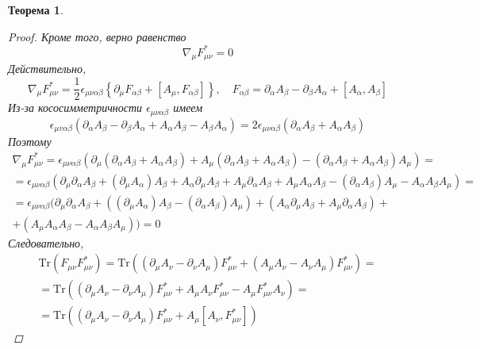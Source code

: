 \documentclass[12pt]{article}
\newtheorem{theorem}{Теорема}[section]
\theoremstyle{definition}
\begin{document}
\begin{theorem}
\begin{proof}
        Кроме того, верно равенство
        \begin{equation}
            \nabla_\mu F_{\mu \nu}^*=0
        \end{equation}
        Действительно,
        \begin{equation}
            \nabla_\mu F_{\mu \nu}^*=\frac{1}{2} \epsilon_{\mu \nu \alpha \beta}\left\{\partial_\mu F_{\alpha \beta}+\left[A_\mu, F_{\alpha \beta}\right]\right\},\quad F_{\alpha \beta}=\partial_\alpha A_\beta-\partial_\beta A_\alpha+[A_\alpha,A_\beta]
        \end{equation}
        Из-за кососимметричности $\epsilon_{\mu\nu\alpha\beta}$ имеем
        \begin{equation}
            \epsilon_{\mu v \alpha \beta}\left(\partial_\alpha A_\beta-\partial_\beta A_\alpha+A_\alpha A_\beta-A_\beta A_\alpha\right)=2 \epsilon_{\mu \nu \alpha \beta}\left(\partial_\alpha A_\beta+A_\alpha A_\beta\right)
        \end{equation}
        Поэтому
        \begin{multline}
            \nabla_\mu F_{\mu \nu}^*=\epsilon_{\mu \nu \alpha \beta}(\partial_\mu\left(\partial_\alpha A_\beta+A_\alpha A_\beta\right)+A_\mu\left(\partial_\alpha A_\beta+A_\alpha A_\beta\right)-\left(\partial_\alpha A_\beta+A_\alpha A_\beta\right) A_\mu)=\\=\epsilon_{\mu\nu\alpha\beta}(\partial_\mu \partial_\alpha A_\beta+(\partial_\mu A_\alpha)A_\beta+A_\alpha \partial_\mu A_\beta+A_\mu \partial_\alpha A_\beta+A_\mu A_\alpha A_\beta-(\partial_\alpha A_\beta)A_\mu-A_\alpha A_\beta A_\mu)=\\=\epsilon_{\mu\nu\alpha\beta}(\partial_\mu \partial_\alpha A_\beta+((\partial_\mu A_\alpha) A_\beta-(\partial_\alpha A_\beta)A_\mu)+(A_\alpha \partial_\mu A_\beta+A_\mu \partial_\alpha A_\beta)+\\+(A_\mu A_\alpha A_\beta-A_\alpha A_\beta A_\mu))=0
        \end{multline}
        Следовательно,
        \begin{multline}
            \text{Tr}\left(F_{\mu\nu}F_{\mu\nu}^*\right)=\text{Tr}((\partial_\mu A_\nu-\partial_\nu A_\mu)F_{\mu\nu}^*+(A_\mu A_\nu-A_\nu A_\mu)F_{\mu\nu}^*)=\\=\text{Tr}((\partial_\mu A_\nu-\partial_\nu A_\mu) F_{\mu \nu}^*+A_\mu A_\nu F_{\mu \nu}^*-A_\mu F_{\mu \nu}^* A_\nu)=\\=\text{Tr}((\partial_\mu A_\nu-\partial_\nu A_\mu) F_{\mu\nu}^*+A_\mu[A_\nu,F_{\mu\nu}^*])
        \end{multline}

\end{proof}
\end{theorem}
\end{document}
